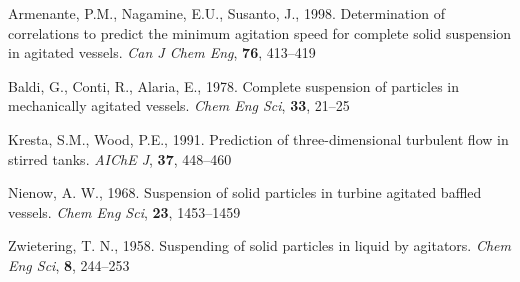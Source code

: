 \begin{thebibliography}{99}

 Armenante, P.M., Nagamine, E.U., Susanto, J., 1998. Determination of correlations to predict the minimum agitation speed for complete solid suspension in agitated vessels. \textit{Can J Chem Eng}, \textbf{76}, 413--419

 Baldi, G., Conti, R., Alaria, E., 1978. Complete suspension of particles in mechanically agitated vessels. \textit{Chem Eng Sci}, \textbf{33}, 21--25 

 Kresta, S.M., Wood, P.E., 1991. Prediction of three-dimensional turbulent flow in stirred tanks. \textit{AIChE J}, \textbf{37}, 448--460 

 Nienow, A. W., 1968. Suspension of solid particles in turbine agitated baffled vessels. \textit{Chem Eng Sci}, \textbf{23}, 1453--1459 

 Zwietering, T. N., 1958. Suspending of solid particles in liquid by agitators. \textit{Chem Eng Sci}, \textbf{8}, 244--253 

\end{thebibliography}
